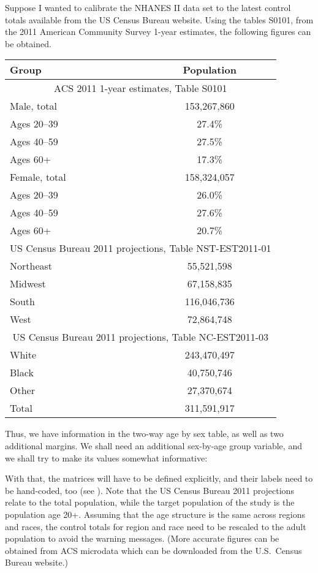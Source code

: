 \begin{stexample}[Example 2]

Suppose I wanted to calibrate
the NHANES II data set to the latest control totals available
from the US Census Bureau website. Using the tables
S0101,
from the 2011 American Community Survey 1-year estimates,
the following figures can be obtained.

\begin{tabular}{lc}
    Group & Population \\
    \hline
    \multicolumn{2}{c}{ACS 2011 1-year estimates, Table S0101} \\
    Male, total & 153,267,860 \\
    Ages 20--39 & 27.4\% \\
    Ages 40--59 & 27.5\% \\
    Ages 60+    & 17.3\% \\
    Female, total & 158,324,057 \\
    Ages 20--39 & 26.0\% \\
    Ages 40--59 & 27.6\% \\
    Ages 60+    & 20.7\% \\
    \multicolumn{2}{c}{US Census Bureau 2011 projections, Table NST-EST2011-01} \\
    Northeast & 55,521,598 \\
    Midwest   & 67,158,835 \\
    South     & 116,046,736 \\
    West      & 72,864,748 \\
    \multicolumn{2}{c}{US Census Bureau 2011 projections, Table NC-EST2011-03} \\
    White     & 243,470,497 \\
    Black     & 40,750,746 \\
    Other     & 27,370,674 \\
    \hline
    Total     & 311,591,917
\end{tabular}

Thus, we have information in the two-way age by sex table, as well
as two additional margins. We shall need an additional sex-by-age group variable,
and we shall try to make its values somewhat informative:

\begin{stlog}
\nullskip
\end{stlog}

With that, the matrices will have to be defined explicitly,
and their labels need to be hand-coded, too (see ).
Note that the US Census Bureau 2011
projections relate to the total population, while the target population
of the study is the population age 20+. Assuming that the age structure
is the same across regions and races, the control totals for region and race
need to be rescaled to the adult population to avoid the warning messages.
(More accurate figures can be obtained from ACS microdata which can be downloaded
from the U.S.\ Census Bureau website.)


\end{stexample}
